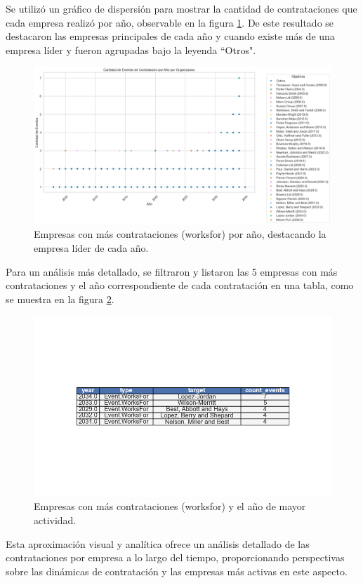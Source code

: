 \documentclass[11pt,spanish,a4paper]{article}
\begin{document}
Se utilizó un gráfico de dispersión para mostrar la cantidad de contrataciones que cada empresa realizó por año, observable en la figura \ref{fig:dispersion_contrataciones}. De este resultado se destacaron las empresas principales de cada año y cuando existe más de una empresa líder y fueron agrupadas bajo la leyenda ``Otros".

\begin{figure}[H]
  \centering
  \includegraphics[width=0.7\linewidth]{graphs/dispersion_contrataciones_top_anio.png}
  \caption{Empresas con más contrataciones (worksfor) por año, destacando la empresa líder de cada año.}
  \label{fig:dispersion_contrataciones}
\end{figure}

Para un análisis más detallado, se filtraron y listaron las 5 empresas con más contrataciones y el año correspondiente de cada contratación en una tabla, como se muestra en la figura \ref{fig:top_contrataciones}.

\begin{figure}[H]
  \centering
  \includegraphics[width=0.7\linewidth]{graphs/tabla_top_contratasciones_anio.png}
  \caption{Empresas con más contrataciones (worksfor) y el año de mayor actividad.}
  \label{fig:top_contrataciones}
\end{figure}

Esta aproximación visual y analítica ofrece un análisis detallado de las contrataciones por empresa a lo largo del tiempo, proporcionando perspectivas sobre las dinámicas de contratación y las empresas más activas en este aspecto.
\end{document}
